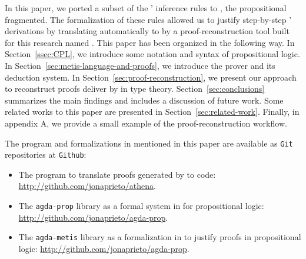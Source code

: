 \documentclass[../main.tex]{subfiles}
\begin{document}
In this paper, we ported a subset of the \Metis' inference rules to
\Agda, the propositional fragmented. The formalization of
these rules allowed us to justify step-by-step \Metis' \TSTP derivations by
translating automatically to \Agda by a proof-reconstruction tool built for
this research named \Athena.
This paper has been organized in the following way.
In Section~\ref{ssec:CPL}, we introduce some
notation and syntax of propositional logic.
In Section~\ref{sec:metis-language-and-proofs}, we introduce the
\Metis prover and its deduction system.
In Section~\ref{sec:proof-reconstruction}, we present our
approach to reconstruct proofs deliver by \Metis in type theory.
Section~\ref{sec:conclusions} summarizes the main findings and includes a
discussion of future work.
Some related works to this paper are presented in Section~\ref{sec:related-work}.
Finally, in appendix \textsc{A}, we provide a small example of the
proof-reconstruction workflow.

The program and formalizations in \Agda mentioned in this paper are available
as \verb!Git! repositories at \verb!Github!:

\begin{itemize}
  \item The \Athena program to translate proofs generated by \Metis to \Agda code:
  \url{http://github.com/jonaprieto/athena}.
  \item The \verb!agda-prop! library as a formal system in \Agda for propositional logic:
  \url{http://github.com/jonaprieto/agda-prop}.
  \item The \verb!agda-metis! library as a formalization in \Agda to justify \Metis proofs in propositional
  logic:
  \url{http://github.com/jonaprieto/agda-prop}.
\end{itemize}
\end{document}
